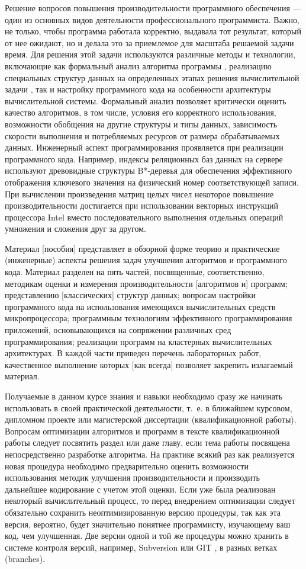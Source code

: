 \documentclass[14pt, a4paper, openany, twoside, final]{extbook} %
\newcommand{\e}[2][fcolor]{\textcolor{pcolor}{[}\textcolor{#1}{#2}\textcolor{pcolor}{]}}
\begin{document}
Решение вопросов повышения производительности программного обеспечения --- один из основных видов деятельности профессионального программиста.  Важно, не только, чтобы программа работала корректно, выдавала тот результат, который от нее ожидают, но и делала это за приемлемое для масштаба решаемой задачи время.  Для решения этой задачи используются различные методы и технологии, включающие как формальный анализ алгоритма программы \cite{progproof}, реализацию специальных структур данных на определенных этапах решения вычислительной задачи \cite{algstruct}, так и настройку программного кода на особенности архитектуры вычислительной системы.  Формальный анализ позволяет критически оценить качество алгоритмов, в том числе, условия его корректного использования, возможности обобщения на другие структуры и типы данных, зависимость скорости выполнения и потребляемых ресурсов от размера обрабатываемых данных.  Инженерный аспект программирования проявляется при реализации программного кода.  Например, индексы реляционных баз данных на сервере используют древовидные структуры B*-деревья для обеспечения эффективного отображения ключевого значения на физический номер соответствующей записи.  При вычислении произведения матриц целых чисел некоторое повышение производительности достигается при использовании векторных инструкций процессора Intel вместо последовательного выполнения отдельных операций умножения и сложения друг за другом.

Материал \e{пособия} представляет в обзорной форме теорию и практические (инженерные) аспекты решения задач улучшения алгоритмов и программного кода.  Материал разделен на пять частей, посвященные, соответственно, методикам оценки и измерения производительности \e{алгоритмов и} программ; представлению \e{классических} структур данных; вопросам настройки программного кода на использования имеющихся вычислительных средств микропроцессора; программным технологиям эффективного программирования приложений, основывающихся на сопряжении различных сред программирования; реализации программ на кластерных вычислительных архитектурах.  В каждой части приведен перечень лабораторных работ, качественное выполнение которых \e{как всегда} позволяет закрепить излагаемый материал.

Получаемые в данном курсе знания и навыки необходимо сразу же начинать использовать в своей практической деятельности, т.~е. в ближайшем курсовом, дипломном проекте или магистерской диссертации (квалификационной работы).  Вопросам оптимизации алгоритмов и программ в тексте квалификационной работы следует посвятить раздел или даже главу, если тема работы посвящена непосредственно разработке алгоритма.  На практике всякий раз как реализуется новая процедура необходимо предварительно оценить возможности использования методик улучшения производительности и производить дальнейшее кодирование с учетом этой оценки.  Если уже была реализован некоторый вычислительный процесс, то перед внедрением оптимизации следует обязательно сохранить неоптимизированную версию процедуры, так как эта версия, вероятно, будет значительно понятнее программисту, изучающему ваш код, чем улучшенная.  Две версии одной и той же процедуры можно хранить в системе контроля версий, например, Subversion \cite{svn} или GIT \cite{git}, в разных ветках (branches).
\end{document}
